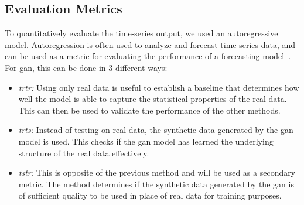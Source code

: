 \subsection{Evaluation Metrics}
%
To quantitatively evaluate the time-series output, we used an autoregressive model. Autoregression is often used to analyze and forecast time-series data, and can be used as a metric for evaluating the performance of a forecasting model~\cite{rnntimeseries}. For \gls*{gan}, this can be done in 3 different ways: %
\begin{itemize}
    \item \textit{\gls*{trtr}:} Using only real data is useful to establish a baseline that determines how well the model is able to capture the statistical properties of the real data. This can then be used to validate the performance of the other methods.
    \item \textit{\gls*{trts}:} Instead of testing on real data, the synthetic data generated by the 
    \gls*{gan} model is used. This checks if the \gls*{gan} model has learned the underlying structure of the real data effectively.
    \item \textit{\gls*{tstr}:} This is opposite of the previous method and will be used as a secondary metric. The method determines if the synthetic data generated by the \gls*{gan} is of sufficient quality to be used in place of real data for training purposes.
\end{itemize}



%
